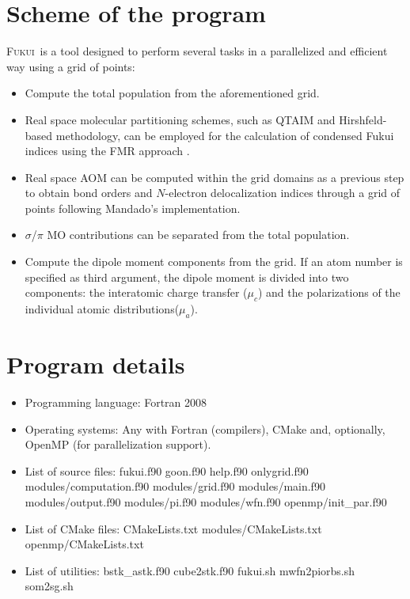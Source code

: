 \documentclass[a4paper,11pt,openany]{memoir}
\newcommand\programa{\textsc{Fukui}}
\begin{document}
\section{Scheme of the program}
\programa~is a tool designed to perform several tasks in a parallelized and efficient way using a grid of points:
\begin{itemize}
	\item	Compute the total population from the aforementioned grid.
	\item	Real space molecular partitioning schemes, such as QTAIM\autocite{bader1994atoms} and Hirshfeld-based\autocite{BondedatomfragmentsHirshfeld1977,CriticalanalysisextensionBAA2007,ExtensionHirshfeldMethodGKB2011} methodology, can be employed for the calculation of condensed Fukui indices using the \ac{FMR} approach \autocite{RevisitingcalculationcondensedOMM2007,ChemicalreactivityframeworkOM2012}.
	\item	Real space \ac{AOM} can be computed within the grid domains as a previous step to obtain bond orders and $N$-electron delocalization indices through a grid of points following Mandado's implementation\autocite{QTAIMncenterdelocalizationMGM2007,LocalaromaticitystudyMOM2006}.
	\item	$\sigma$/$\pi$ \ac{MO} contributions can be separated from the total population.
	\item	Compute the dipole moment components from the grid. If an atom number is specified as third argument, the dipole moment is divided into two components: the interatomic charge transfer ($\mu_{c}$) and the polarizations of the individual atomic distributions($\mu_{a}$)\autocite{bader1994atoms}.
\end{itemize}

\section{Program details}
\begin{itemize}
	\item Programming language: Fortran 2008
	\item Operating systems: Any with Fortran (compilers), CMake and, optionally, OpenMP (for parallelization support).
	\item List of source files:
		fukui.f90
		goon.f90
		help.f90
		onlygrid.f90
		modules/computation.f90
		modules/grid.f90
		modules/main.f90
		modules/output.f90
		modules/pi.f90
		modules/wfn.f90
		openmp/init\_par.f90
	\item List of CMake files:
		CMakeLists.txt
		modules/CMakeLists.txt
		openmp/CMakeLists.txt
	\item List of utilities:
		bstk\_astk.f90
		cube2stk.f90
		fukui.sh
		mwfn2piorbs.sh
		som2sg.sh
\end{itemize}
\end{document}
